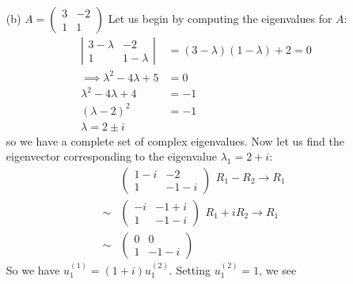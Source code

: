 \documentclass{article}
\begin{document}
\begin{itemize}
\begin{itemize}
        \item[(b)] $A = \begin{pmatrix}
            3 & -2\\
            1 & 1
        \end{pmatrix}$
        \newline\newline
        Let us begin by computing the eigenvalues for $A$:
        \begin{align*}
            \left|\begin{matrix}
                3 - \lambda & -2\\
                1 & 1 - \lambda
            \end{matrix}\right| &= (3 - \lambda)(1 - \lambda) + 2 = 0\\
            \implies \lambda^2 - 4\lambda + 5 &= 0\\
            \lambda^2 - 4\lambda + 4 &= -1\\
            (\lambda - 2)^2 &= -1\\
            \lambda = 2 \pm i
        \end{align*}
        so we have a complete set of complex eigenvalues. Now let us find the eigenvector corresponding to the eigenvalue $\lambda_1 = 2 + i$:
        \begin{align*}
            &\begin{pmatrix}
                1 - i & -2\\
                1 & -1 - i
            \end{pmatrix}\begin{matrix}
                R_1 - R_2 \to R_1\\
            \end{matrix}\\
            \sim&\begin{pmatrix}
                -i & -1 + i\\
                1 & - 1 - i
            \end{pmatrix}\begin{matrix}
                R_1 + iR_2 \to R_1
            \end{matrix}\\
            \sim &\begin{pmatrix}
                0 & 0\\
                1 & -1 - i
            \end{pmatrix}
        \end{align*}
        So we have $u_1^{(1)} = (1 + i)u_1^{(2)}$. Setting $u_1^{(2)} = 1$, we see

\end{itemize}
\end{itemize}
\end{document}
